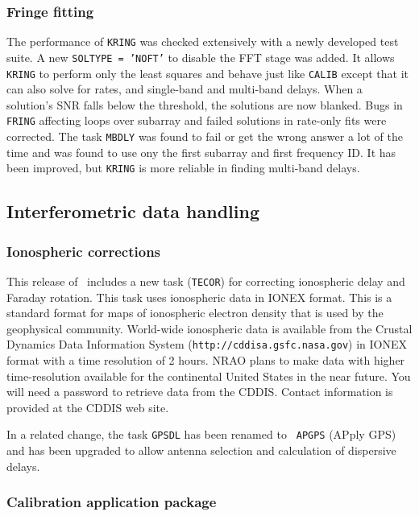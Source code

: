 \subsubsection{Fringe fitting}

The performance of {\tt KRING} was checked extensively with a newly
developed test suite.  A new {\tt SOLTYPE = 'NOFT'} to disable the FFT
stage was added.  It allows {\tt KRING} to perform only the least
squares and behave just like {\tt CALIB} except that it can also solve
for rates, and single-band and multi-band delays. When a solution's
SNR falls below the threshold, the solutions are now blanked.  Bugs in
{\tt FRING} affecting loops over subarray and failed solutions in
rate-only fits were corrected.  The task {\tt MBDLY} was found to fail
or get the wrong answer a lot of the time and was found to use ony the
first subarray and first frequency ID\@.  It has been improved, but
{\tt KRING} is more reliable in finding multi-band delays.

\subsection{Interferometric data handling}

\subsubsection{Ionospheric corrections}

This release of \AIPS\ includes a new task ({\tt TECOR}) for
correcting ionospheric delay and Faraday rotation.  This task uses
ionospheric data in IONEX format.  This is a standard format for maps
of ionospheric electron density that is used by the geophysical
community.  World-wide ionospheric data is available from the Crustal
Dynamics Data Information System ({\tt http://cddisa.gsfc.nasa.gov})
in IONEX format with a time resolution of 2 hours.  NRAO plans to make
data with higher time-resolution available for the continental United
States in the near future.  You will need a password to retrieve data
from the CDDIS. Contact information is provided at the CDDIS web site.

In a related change, the task {\tt GPSDL} has been renamed to {\tt
APGPS} (APply GPS) and has been upgraded to allow antenna selection
and calculation of dispersive delays.


\subsubsection{Calibration application package}

